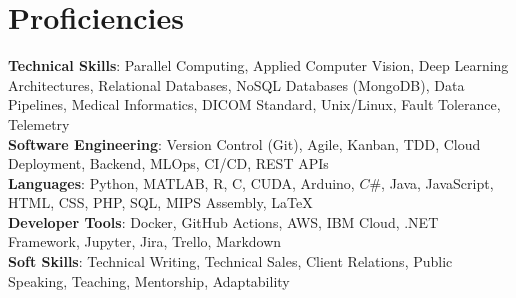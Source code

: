 \documentclass[letterpaper,10pt]{article}
\def\proficiencySpace{3pt}
\begin{document}
\section{Proficiencies}
\vspace{2pt}
 \begin{itemize}[leftmargin=0.15in, label={}]
    \small{\item{
     \textbf{Technical Skills}{: Parallel Computing, Applied Computer Vision, Deep Learning Architectures, Relational Databases, NoSQL Databases (MongoDB), Data Pipelines, Medical Informatics, DICOM Standard, Unix/Linux, Fault Tolerance, Telemetry} \vspace{\proficiencySpace} \\ 
     \textbf{Software Engineering}{: Version Control (Git), Agile, Kanban, TDD, Cloud Deployment, Backend, MLOps, CI/CD, REST APIs} \vspace{\proficiencySpace} \\ 
     \textbf{Languages}{: Python, MATLAB, R, C, CUDA, Arduino, $C\#$, Java, JavaScript, HTML, CSS, PHP, SQL, MIPS Assembly, LaTeX} \vspace{\proficiencySpace} \\
     \textbf{Developer Tools}{: Docker, GitHub Actions, AWS, IBM Cloud, .NET Framework, Jupyter, Jira, Trello, Markdown} \vspace{\proficiencySpace} \\
     \textbf{Soft Skills}{: Technical Writing, Technical Sales, Client Relations, Public Speaking, Teaching, Mentorship, Adaptability}
    }}
 \end{itemize}
\end{document}
